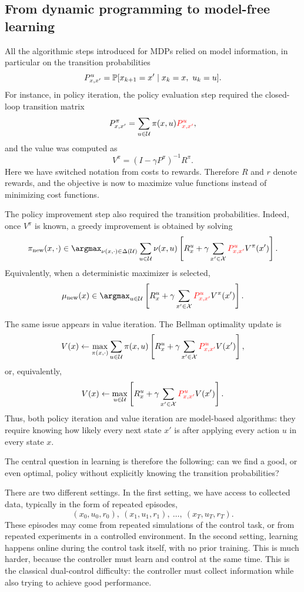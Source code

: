 \subsection{From dynamic programming to model-free learning}

All the algorithmic steps introduced for MDPs relied on model information, in particular on the
transition probabilities
\[
P^u_{x,x'}
=
\mathbb{P}[x_{k+1}=x'\mid x_k=x,\ u_k=u].
\]
For instance, in policy iteration, the policy evaluation step required the closed-loop transition
matrix
\[
P^\pi_{x,x'}
=
\sum_{u\in\mathcal{U}}\pi(x,u)\textcolor{red}{P^u_{x,x'}},
\]
and the value was computed as
\[
V^\pi
=
(I-\gamma P^\pi)^{-1}R^\pi.
\]
Here we have switched notation from costs to rewards. Therefore \(R\) and \(r\) denote rewards,
and the objective is now to maximize value functions instead of minimizing cost functions.

The policy improvement step also required the transition probabilities. Indeed, once \(V^\pi\)
is known, a greedy improvement is obtained by solving
\[
\pi_{\mathrm{new}}(x,\cdot)
\in
\argmax_{\nu(x,\cdot)\in\Delta(\cU)}
\sum_{u\in\cU}\nu(x,u)
\left[
R_x^u
+
\gamma\sum_{x'\in\cX}\textcolor{red}{P^u_{x,x'}}V^\pi(x')
\right].
\]
Equivalently, when a deterministic maximizer is selected,
\[
\mu_{\mathrm{new}}(x)
\in
\argmax_{u\in\cU}
\left[
R_x^u
+
\gamma\sum_{x'\in\cX}\textcolor{red}{P^u_{x,x'}}V^\pi(x')
\right].
\]

The same issue appears in value iteration. The Bellman optimality update is
\[
V(x)
\leftarrow
\max_{\pi(x,\cdot)}
\sum_{u\in\mathcal{U}}\pi(x,u)
\left[
R_x^u
+
\gamma\sum_{x'\in\mathcal{X}}\textcolor{red}{P^u_{x,x'}}V(x')
\right],
\]
or, equivalently,
\[
V(x)
\leftarrow
\max_{u\in\mathcal{U}}
\left[
R_x^u
+
\gamma\sum_{x'\in\mathcal{X}}\textcolor{red}{P^u_{x,x'}}V(x')
\right].
\]
Thus, both policy iteration and value iteration are model-based algorithms: they require
knowing how likely every next state \(x'\) is after applying every action \(u\) in every state
\(x\).

The central question in learning is therefore the following: can we find a good, or even optimal,
policy without explicitly knowing the transition probabilities?

There are two different settings. In the first setting, we have access to collected data, typically
in the form of repeated episodes,
\[
(x_0,u_0,r_0),\ (x_1,u_1,r_1),\ \dots,\ (x_T,u_T,r_T).
\]
These episodes may come from repeated simulations of the control task, or from repeated
experiments in a controlled environment. In the second setting, learning happens online during
the control task itself, with no prior training. This is much harder, because the controller must
learn and control at the same time. This is the classical dual-control difficulty: the controller
must collect information while also trying to achieve good performance.

